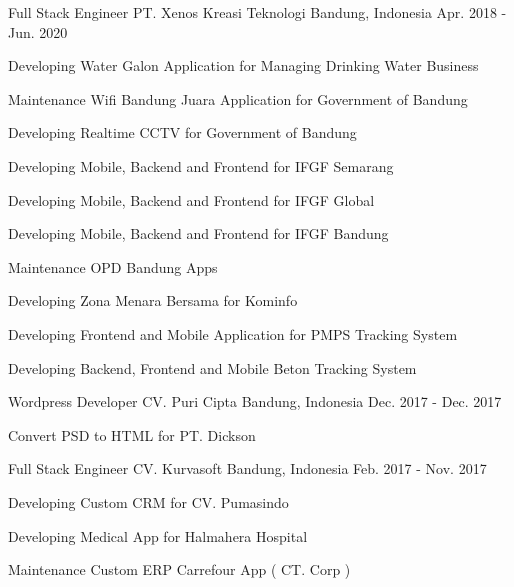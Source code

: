 \begin{cventries}
  \cventry
    {Full Stack Engineer} %
    {PT. Xenos Kreasi Teknologi} %
    {Bandung, Indonesia} %
    {Apr. 2018 - Jun. 2020} %
    {
      \begin{cvitems} %
        \item {Developing Water Galon Application for Managing Drinking Water Business}
        \item {Maintenance Wifi Bandung Juara Application for Government of Bandung}
        \item {Developing Realtime CCTV for Government of Bandung}
        \item {Developing Mobile, Backend and Frontend for IFGF Semarang}
        \item {Developing Mobile, Backend and Frontend for IFGF Global}
        \item {Developing Mobile, Backend and Frontend for IFGF Bandung}
        \item {Maintenance OPD Bandung Apps}
        \item {Developing Zona Menara Bersama for Kominfo}
        \item {Developing Frontend and Mobile Application for PMPS Tracking System}
        \item {Developing Backend, Frontend and Mobile Beton Tracking System}
      \end{cvitems}
    }

  \cventry
    {Wordpress Developer} %
    {CV. Puri Cipta} %
    {Bandung, Indonesia} %
    {Dec. 2017 - Dec. 2017} %
    {
      \begin{cvitems} %
        \item {Convert PSD to HTML for PT. Dickson}
      \end{cvitems}
    }

  \cventry
    {Full Stack Engineer} %
    {CV. Kurvasoft} %
    {Bandung, Indonesia} %
    {Feb. 2017 - Nov. 2017} %
    {
      \begin{cvitems} %
        \item {Developing Custom CRM for CV. Pumasindo}
        \item {Developing Medical App for Halmahera Hospital}
        \item {Maintenance Custom ERP Carrefour App ( CT. Corp )}
      \end{cvitems}
    }


\end{cventries}
